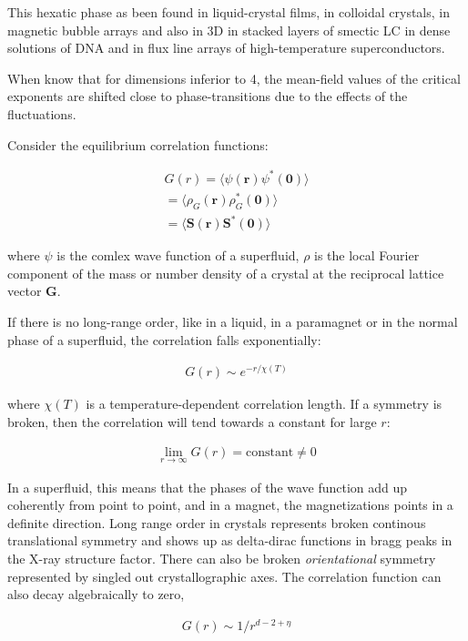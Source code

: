 \documentclass[a4paper]{article}
\begin{document}
This hexatic phase as been found in liquid-crystal films, in colloidal crystals, in magnetic bubble arrays and also in 3D in stacked layers of smectic LC in dense solutions of DNA and in flux line arrays of high-temperature superconductors.

When know that for dimensions inferior to 4, the mean-field values of the critical exponents are shifted close to phase-transitions due to the effects of the fluctuations.

Consider the equilibrium correlation functions:

\begin{align*}
	G(r) = \langle \psi(\mathbf{r})\psi^*(\mathbf{0})\rangle \\
	 = \langle \rho_G(\mathbf{r})\rho_G^*(\mathbf{0})\rangle \\
	  = \langle \mathbf{S}(\mathbf{r})\mathbf{S}^*(\mathbf{0})\rangle  
\end{align*}

where $\psi$ is the comlex wave function of a superfluid, $\rho$ is the local Fourier component of the mass or number density of a crystal  at the reciprocal lattice vector $\mathbf{G}$.

If there is no long-range order, like in a liquid, in a paramagnet or in the normal phase of a superfluid, the correlation falls exponentially:

\begin{align*}
	G(r)\sim e^{-r/\chi(T)}
\end{align*}

where $\chi(T)$ is a temperature-dependent correlation length. If a symmetry is broken, then the correlation will tend towards a constant for large $r$:

\begin{align*}
	\lim_{r\rightarrow \infty} G(r)=\text{constant}\neq0
\end{align*}

In a superfluid, this means that the phases of the wave function add up coherently from point to point, and in a magnet, the magnetizations points in a definite direction.
Long range order in crystals represents broken continous translational symmetry and shows up as delta-dirac functions in bragg peaks in the X-ray structure factor. There can also be broken \textit{orientational} symmetry represented by singled out crystallographic axes. The correlation function can also decay algebraically to zero,

\begin{align*}
	G(r)\sim 1/r^{d-2+\eta}
\end{align*}
\end{document}
